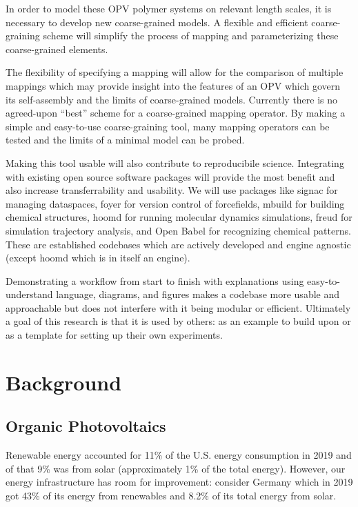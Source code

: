 In order to model these OPV polymer systems on relevant length scales, it is necessary to develop new coarse-grained models.
A flexible and efficient coarse-graining scheme will simplify the process of mapping and parameterizing these coarse-grained elements.

The flexibility of specifying a mapping will allow for the comparison of multiple mappings which may provide insight into the features of an OPV which govern its self-assembly and the limits of coarse-grained models.
Currently there is no agreed-upon ``best'' scheme for a coarse-grained mapping operator.
By making a simple and easy-to-use coarse-graining tool, many mapping operators can be tested and the limits of a minimal model can be probed.

Making this tool usable will also contribute to reproducibile science. 
Integrating with existing open source software packages will provide the most benefit and also increase transferrability and usability.
We will use packages like signac for managing dataspaces, foyer for version control of forcefields, mbuild for building chemical structures, hoomd for running molecular dynamics simulations, freud for simulation trajectory analysis, and Open Babel for recognizing chemical patterns\cite{signac, foyer, mbuild, hoomd, freud, openbabel}.
These are established codebases which are actively developed and engine agnostic (except hoomd which is in itself an engine).

Demonstrating a workflow from start to finish with explanations using easy-to-understand language, diagrams, and figures makes a codebase more usable and approachable but does not interfere with it being modular or efficient.
Ultimately a goal of this research is that it is used by others: as an example to build upon or as a template for setting up their own experiments.

\section*{Background}

\subsection*{Organic Photovoltaics}

Renewable energy accounted for 11\% of the U.S. energy consumption in 2019 and of that 9\% was from solar (approximately 1\% of the total energy)\cite{USEIA2020}.
However, our energy infrastructure has room for improvement: consider Germany which in 2019 got 43\% of its energy from renewables and 8.2\% of its total energy from solar\cite{Wirth2017}.

